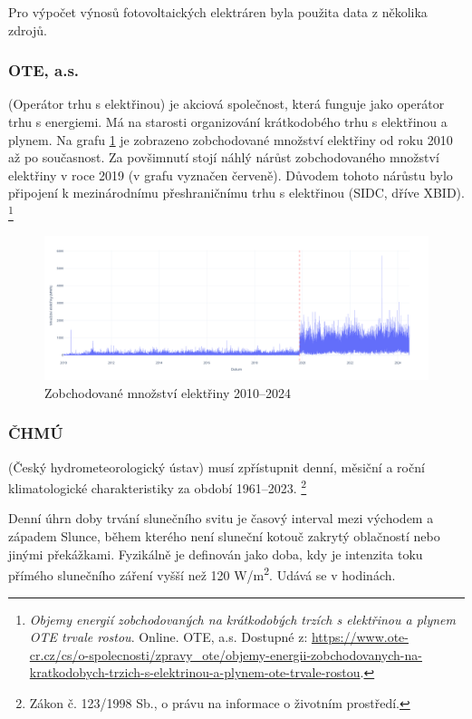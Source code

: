 Pro výpočet výnosů fotovoltaických elektráren byla použita data z několika zdrojů.

\subsubsection*{OTE, a.s.}
(Operátor trhu s elektřinou) je akciová společnost, která funguje jako operátor trhu s energiemi.
Má na starosti organizování krátkodobého trhu s elektřinou a plynem.
Na grafu \ref{fig:ote} je zobrazeno zobchodované množství elektřiny od roku 2010 až po současnost.
Za povšimnutí stojí náhlý nárůst zobchodovaného množství elektřiny v roce 2019 (v grafu vyznačen červeně).
Důvodem tohoto nárůstu bylo připojení k mezinárodnímu přeshraničnímu trhu s elektřinou (SIDC, dříve XBID). \footnote[1]{\textit{Objemy energií zobchodovaných na krátkodobých trzích s elektřinou a plynem OTE trvale rostou}. Online. OTE, a.s. Dostupné z: \url{https://www.ote-cr.cz/cs/o-spolecnosti/zpravy_ote/objemy-energii-zobchodovanych-na-kratkodobych-trzich-s-elektrinou-a-plynem-ote-trvale-rostou}.}
\begin{figure}[H]
    \includegraphics[width=\textwidth]{static/graphs/ote.png}
    \caption{Zobchodované množství elektřiny 2010--2024}
    \label{fig:ote}
\end{figure}

 
\subsubsection*{ČHMÚ} (Český hydrometeorologický ústav) musí zpřístupnit denní, měsiční a roční klimatologické charakteristiky za období 1961--2023. \footnote[2]{Zákon č. 123/1998 Sb., o právu na informace o životním prostředí.}

Denní úhrn doby trvání slunečního svitu je časový interval mezi východem a západem Slunce,
během kterého není sluneční kotouč zakrytý oblačností nebo jinými překážkami.
Fyzikálně je definován jako doba, kdy je intenzita toku přímého slunečního záření vyšší než 120 \si{\watt}/\si{\meter\squared}.
Udává se v hodinách.

